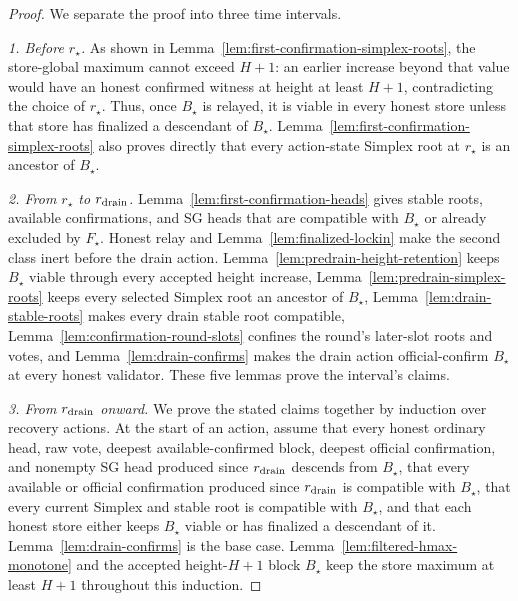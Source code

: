 \begin{proof}
We separate the proof into three time intervals.

\emph{1. Before \(r_\star\).}
As shown in Lemma~\ref{lem:first-confirmation-simplex-roots}, the store-global maximum
cannot exceed \(H+1\): an earlier increase beyond that value would have an
honest confirmed witness at height at least \(H+1\), contradicting the
choice of \(r_\star\).  Thus, once \(B_\star\) is relayed, it is viable in
every honest store unless that store has finalized a descendant of
\(B_\star\).  Lemma~\ref{lem:first-confirmation-simplex-roots} also proves
directly that every action-state Simplex root at \(r_\star\) is an ancestor
of \(B_\star\).

\emph{2. From \(r_\star\) to \(r_{\rm drain}\).}
Lemma~\ref{lem:first-confirmation-heads} gives stable roots, available
confirmations, and SG heads that are compatible with \(B_\star\) or already
excluded by \(F_\star\).  Honest relay and
Lemma~\ref{lem:finalized-lockin} make the second class inert before the drain
action.
Lemma~\ref{lem:predrain-height-retention} keeps \(B_\star\) viable
through every accepted height increase,
Lemma~\ref{lem:predrain-simplex-roots} keeps every selected Simplex
root an ancestor of \(B_\star\),
Lemma~\ref{lem:drain-stable-roots} makes every drain stable root
compatible, Lemma~\ref{lem:confirmation-round-slots} confines the
round's later-slot roots and votes, and Lemma~\ref{lem:drain-confirms}
makes the drain action official-confirm \(B_\star\) at every honest
validator.  These five lemmas prove the interval's claims.

\emph{3. From \(r_{\rm drain}\) onward.}
We prove the stated claims together by induction over recovery actions.  At
the start of an action, assume that every honest ordinary head, raw vote,
deepest available-confirmed block, deepest official confirmation, and nonempty
SG head produced since
\(r_{\rm drain}\) descends from \(B_\star\), that every available or official
confirmation produced since \(r_{\rm drain}\) is compatible with \(B_\star\),
that every current Simplex and
stable root is compatible with \(B_\star\), and that each honest store either
keeps \(B_\star\) viable or has finalized a descendant of it.  Lemma~\ref{lem:drain-confirms} is the base case.
Lemma~\ref{lem:filtered-hmax-monotone} and the accepted height-\(H+1\) block
\(B_\star\) keep the store maximum at least \(H+1\) throughout this
induction.


\end{proof}
